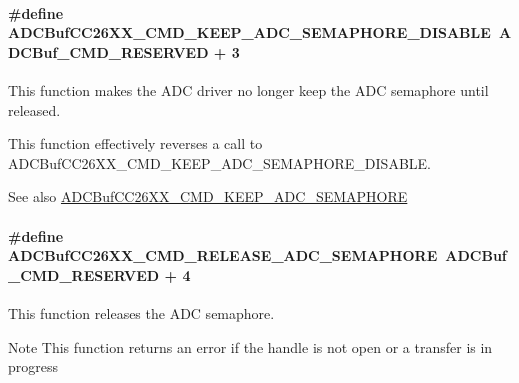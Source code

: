 \paragraph[{A\+D\+C\+Buf\+C\+C26\+X\+X\+\_\+\+C\+M\+D\+\_\+\+K\+E\+E\+P\+\_\+\+A\+D\+C\+\_\+\+S\+E\+M\+A\+P\+H\+O\+R\+E\+\_\+\+D\+I\+S\+A\+B\+L\+E}]{\setlength{\rightskip}{0pt plus 5cm}\#define A\+D\+C\+Buf\+C\+C26\+X\+X\+\_\+\+C\+M\+D\+\_\+\+K\+E\+E\+P\+\_\+\+A\+D\+C\+\_\+\+S\+E\+M\+A\+P\+H\+O\+R\+E\+\_\+\+D\+I\+S\+A\+B\+L\+E~{\bf A\+D\+C\+Buf\+\_\+\+C\+M\+D\+\_\+\+R\+E\+S\+E\+R\+V\+E\+D} + 3}\label{group___a_d_c_buf___c_m_d_ga23015764922f21c49518aa1050d70c0e}


This function makes the A\+D\+C driver no longer keep the A\+D\+C semaphore until released. 

This function effectively reverses a call to A\+D\+C\+Buf\+C\+C26\+X\+X\+\_\+\+C\+M\+D\+\_\+\+K\+E\+E\+P\+\_\+\+A\+D\+C\+\_\+\+S\+E\+M\+A\+P\+H\+O\+R\+E\+\_\+\+D\+I\+S\+A\+B\+L\+E.

\begin{DoxySeeAlso}{See also}
\hyperlink{group___a_d_c_buf___c_m_d_ga830dac4199ded43c278e48bb1fe9725e}{A\+D\+C\+Buf\+C\+C26\+X\+X\+\_\+\+C\+M\+D\+\_\+\+K\+E\+E\+P\+\_\+\+A\+D\+C\+\_\+\+S\+E\+M\+A\+P\+H\+O\+R\+E} 
\end{DoxySeeAlso}
\paragraph[{A\+D\+C\+Buf\+C\+C26\+X\+X\+\_\+\+C\+M\+D\+\_\+\+R\+E\+L\+E\+A\+S\+E\+\_\+\+A\+D\+C\+\_\+\+S\+E\+M\+A\+P\+H\+O\+R\+E}]{\setlength{\rightskip}{0pt plus 5cm}\#define A\+D\+C\+Buf\+C\+C26\+X\+X\+\_\+\+C\+M\+D\+\_\+\+R\+E\+L\+E\+A\+S\+E\+\_\+\+A\+D\+C\+\_\+\+S\+E\+M\+A\+P\+H\+O\+R\+E~{\bf A\+D\+C\+Buf\+\_\+\+C\+M\+D\+\_\+\+R\+E\+S\+E\+R\+V\+E\+D} + 4}\label{group___a_d_c_buf___c_m_d_gaaacc1d31de8c38e71c351bc1fcd54340}


This function releases the A\+D\+C semaphore. 

\begin{DoxyNote}{Note}
This function returns an error if the handle is not open or a transfer is in progress 
\end{DoxyNote}
